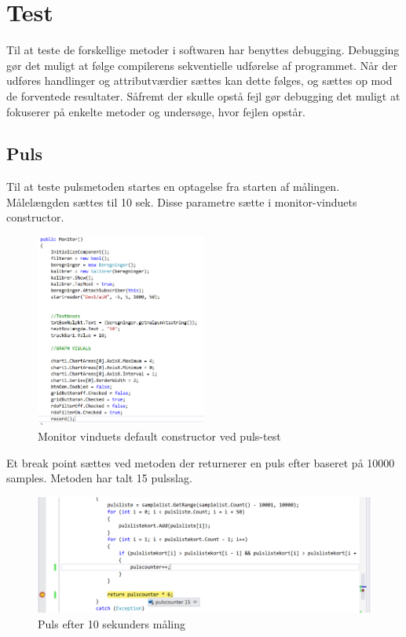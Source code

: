 \section{Test}
Til at teste de forskellige metoder i softwaren har benyttes debugging. Debugging gør det muligt at følge compilerens sekventielle udførelse af programmet. Når der udføres handlinger og attributværdier sættes kan dette følges, og sættes op mod de forventede resultater. Såfremt der skulle opstå fejl gør debugging det muligt at fokuserer på enkelte metoder og undersøge, hvor fejlen opstår.
\subsection{Puls}
Til at teste pulsmetoden startes en optagelse fra starten af målingen. Målelængden sættes til 10 sek. Disse parametre sætte i monitor-vinduets constructor.
\begin{figure}[H]
	\centering
	\includegraphics[width=0.5\textwidth]{Figurer/Pulstest_record}
	\caption{Monitor vinduets default constructor ved puls-test}
\end{figure}
Et break point sættes ved metoden der returnerer en puls efter baseret på 10000 samples. Metoden har talt 15 pulsslag.
\begin{figure}[H]
	\centering
	\includegraphics[width=1\textwidth]{Figurer/Pulstest_debug}
	\caption{Puls efter 10 sekunders måling}
\end{figure}
